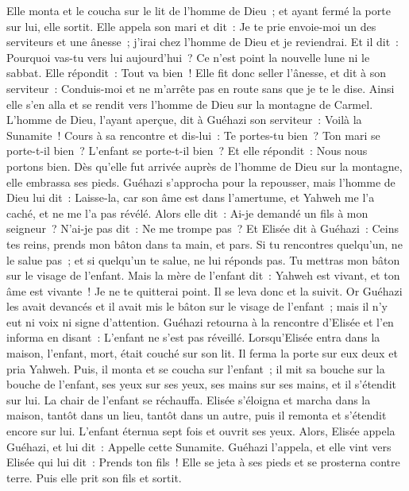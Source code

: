 \begin{multicols}{2}
Elle monta et le coucha sur le lit de l'homme de Dieu~; et ayant fermé la porte sur lui, elle sortit.
Elle appela son mari et dit~: Je te prie envoie-moi un des serviteurs et une ânesse~; j'irai chez l'homme de Dieu et je reviendrai.
Et il dit~: Pourquoi vas-tu vers lui aujourd'hui~? Ce n'est point la nouvelle lune ni le sabbat. Elle répondit~: Tout va bien~!
Elle fit donc seller l'ânesse, et dit à son serviteur~: Conduis-moi et ne m'arrête pas en route sans que je te le dise.
Ainsi elle s'en alla et se rendit vers l'homme de Dieu sur la montagne de Carmel. L'homme de Dieu, l'ayant aperçue, dit à Guéhazi son serviteur~: Voilà la Sunamite~!
Cours à sa rencontre et dis-lui~: Te portes-tu bien~? Ton mari se porte-t-il bien~? L'enfant se porte-t-il bien~? Et elle répondit~: Nous nous portons bien.
Dès qu'elle fut arrivée auprès de l'homme de Dieu sur la montagne, elle embrassa ses pieds. Guéhazi s'approcha pour la repousser, mais l'homme de Dieu lui dit~: Laisse-la, car son âme est dans l'amertume, et Yahweh me l'a caché, et ne me l'a pas révélé.
Alors elle dit~: Ai-je demandé un fils à mon seigneur~? N'ai-je pas dit~: Ne me trompe pas~?
Et Elisée dit à Guéhazi~: Ceins tes reins, prends mon bâton dans ta main, et pars. Si tu rencontres quelqu'un, ne le salue pas~; et si quelqu'un te salue, ne lui réponds pas. Tu mettras mon bâton sur le visage de l'enfant.
Mais la mère de l'enfant dit~: Yahweh est vivant, et ton âme est vivante~! Je ne te quitterai point. Il se leva donc et la suivit.
Or Guéhazi les avait devancés et il avait mis le bâton sur le visage de l'enfant~; mais il n'y eut ni voix ni signe d'attention. Guéhazi retourna à la rencontre d'Elisée et l'en informa en disant~: L'enfant ne s'est pas réveillé.
Lorsqu'Elisée entra dans la maison, l'enfant, mort, était couché sur son lit.
Il ferma la porte sur eux deux et pria Yahweh.
Puis, il monta et se coucha sur l'enfant~; il mit sa bouche sur la bouche de l'enfant, ses yeux sur ses yeux, ses mains sur ses mains, et il s'étendit sur lui. La chair de l'enfant se réchauffa.
Elisée s'éloigna et marcha dans la maison, tantôt dans un lieu, tantôt dans un autre, puis il remonta et s'étendit encore sur lui. L'enfant éternua sept fois et ouvrit ses yeux.
Alors, Elisée appela Guéhazi, et lui dit~: Appelle cette Sunamite. Guéhazi l'appela, et elle vint vers Elisée qui lui dit~: Prends ton fils~!
Elle se jeta à ses pieds et se prosterna contre terre. Puis elle prit son fils et sortit.

\end{multicols}
